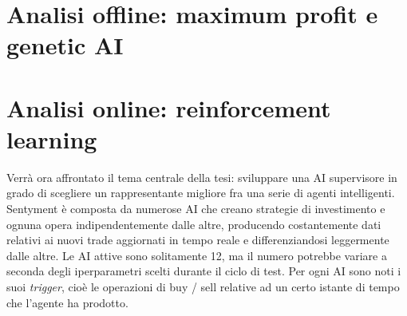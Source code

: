 \documentclass[a4paper,12pt]{report}
\begin{document}
\section{Analisi offline: maximum profit e genetic AI}
\section{Analisi online: reinforcement learning}
Verrà ora affrontato il tema centrale della tesi: sviluppare una AI supervisore in grado di scegliere un rappresentante migliore fra una serie di agenti intelligenti.\\
Sentyment è composta da numerose AI che creano strategie di investimento e ognuna opera indipendentemente dalle altre, producendo costantemente dati relativi ai nuovi trade aggiornati in tempo reale e differenziandosi leggermente dalle altre. Le AI attive sono solitamente 12, ma il numero potrebbe variare a seconda degli iperparametri scelti durante il ciclo di test. Per ogni AI sono noti i suoi \textit{trigger}, cioè le operazioni di buy / sell relative ad un certo istante di tempo che l'agente ha prodotto.
\end{document}
